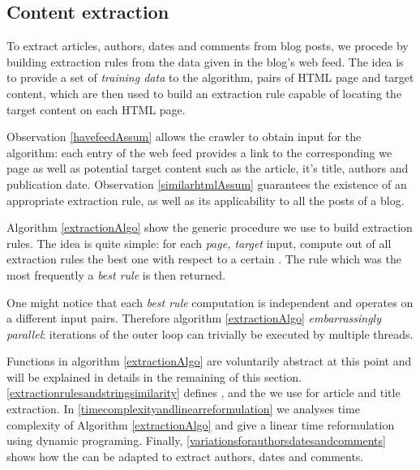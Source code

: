 \subsection{Content extraction}
\label{contentextraction}

To extract articles, authors, dates and comments from blog posts, we procede by building extraction rules from the data given in the blog's web feed. The idea is to provide a set of \emph{training data} to the algorithm, pairs of HTML page and target content, which are then used to build an extraction rule capable of locating the target content on each HTML page.

Observation \ref{havefeedAssum} allows the crawler to obtain input for the algorithm: each entry of the web feed provides a link to the corresponding we page as well as potential target content such as the article, it's title, authors and publication date. Observation \ref{similarhtmlAssum} guarantees the existence of an appropriate extraction rule, as well as its applicability to all the posts of a blog.

Algorithm \ref{extractionAlgo} show the generic procedure we use to build extraction rules. The idea is quite simple: for each \code{(}\emph{page, target}\code{)} input, compute out of all extraction rules the best one with respect to a certain . The rule which was the most frequently a \emph{best rule} is then returned.

\extractionAlgo

One might notice that each \emph{best rule} computation is independent and operates on a different input pairs. Therefore algorithm \ref{extractionAlgo} \emph{embarrassingly parallel}: iterations of the outer loop can trivially be executed by multiple threads.

Functions in algorithm \ref{extractionAlgo} are voluntarily abstract at this point and will be explained in details in the remaining of this section. \ref{extractionrulesandstringsimilarity} defines ,  and the  we use for article and title extraction. In \ref{timecomplexityandlinearreformulation} we analyses time complexity of Algorithm \ref{extractionAlgo} and give a linear time reformulation using dynamic programing. Finally, \ref{variationsforauthorsdatesandcomments} shows how the  can be adapted to extract authors, dates and comments.

